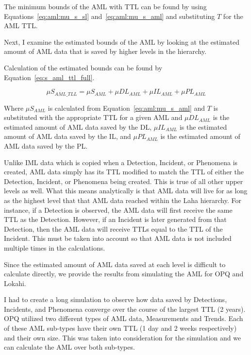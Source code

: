 The minimum bounds of the AML with TTL can be found by using Equations~\ref{eq:aml:mu_s_sl} and~\ref{eq:aml:mu_s_aml} and substituting $T$ for the AML TTL\@.

Next, I examine the estimated bounds of the AML by looking at the estimated amount of AML data that is saved by higher levels in the hierarchy.

Calculation of the estimated bounds can be found by Equation~\ref{eq:s_aml_ttl_full}.

\begin{equation}\label{eq:s_aml_ttl_full}
	\mu S_{AML\_TLL} = \mu S_{AML} + \mu DL_{AML} + \mu IL_{AML} + \mu PL_{AML}
\end{equation}

Where $\mu S_{AML}$ is calculated from Equation~\ref{eq:aml:mu_s_aml} and $T$ is substituted with the appropriate TTL for a given AML and $\mu DL_{AML}$ is the estimated amount of AML data saved by the DL, $\mu IL_{AML}$ is the estimated amount of AML data saved by the IL, and $\mu PL_{AML}$ is the estimated amount of AML data saved by the PL\@.

Unlike IML data which is copied when a Detection, Incident, or Phenomena is created, AML data simply has its TTL modified to match the TTL of either the Detection, Incident, or Phenomena being created. This is true of all other upper levels as well. What this means analytically is that AML data will live for as long as the highest level that that AML data reached within the Laha hierarchy. For instance, if a Detection is observed, the AML data will first receive the same TTL as the Detection. However, if an Incident is later generated from that Detection, then the AML data will receive TTLs equal to the TTL of the Incident. This must be taken into account so that AML data is not included multiple times in the calculations.

Since the estimated amount of AML data saved at each level is difficult to calculate directly, we provide the results from simulating the AML for OPQ and Lokahi.

I had to create a long simulation to observe how data saved by Detections, Incidents, and Phenomena converge over the course of the largest TTL (2 years). OPQ utilized two different types of AML data, Measurements and Trends. Each of these AML sub-types have their own TTL (1 day and 2 weeks respectively) and their own size. This was taken into consideration for the simulation and we can calculate the AML over both sub-types.

